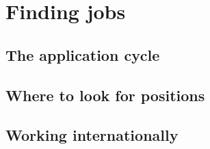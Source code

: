 \chapter{Finding jobs}
\section{The application cycle}
\section{Where to look for positions}
\section{Working internationally}
